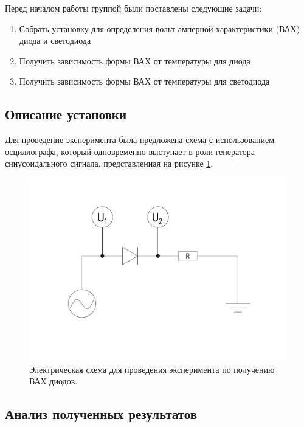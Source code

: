 \documentclass[a4paper, 12pt]{article}
\begin{document}
Перед началом работы группой были поставлены следующие задачи:

\begin{enumerate}
	\item Собрать установку для определения вольт-амперной характеристики (ВАХ) диода и светодиода
	
	\item Получить зависимость формы ВАХ от температуры для диода
	
	\item Получить зависимость формы ВАХ от температуры для светодиода
\end{enumerate}

\subsection{Описание установки}

Для проведение эксперимента была предложена схема с использованием осциллографа, который одновременно выступает в роли генератора синусоидального сигнала, представленная на рисунке \ref{fig:2_Experiment_Scheme}.

\begin{figure}[H]
	\centering
	\includegraphics[width=\linewidth]{2_Experiment_Scheme}
	\caption{Электрическая схема для проведения эксперимента по получению ВАХ диодов.}
	\label{fig:2_Experiment_Scheme}
\end{figure}

\subsection{Анализ полученных результатов}
\end{document}
